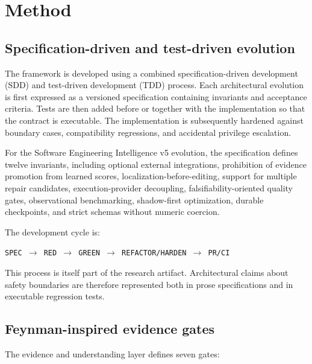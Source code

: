 \section{Method}

\subsection{Specification-driven and test-driven evolution}

The framework is developed using a combined specification-driven development (SDD) and test-driven development (TDD) process. Each architectural evolution is first expressed as a versioned specification containing invariants and acceptance criteria. Tests are then added before or together with the implementation so that the contract is executable. The implementation is subsequently hardened against boundary cases, compatibility regressions, and accidental privilege escalation.

For the Software Engineering Intelligence v5 evolution, the specification defines twelve invariants, including optional external integrations, prohibition of evidence promotion from learned scores, localization-before-editing, support for multiple repair candidates, execution-provider decoupling, falsifiability-oriented quality gates, observational benchmarking, shadow-first optimization, durable checkpoints, and strict schemas without numeric coercion.

The development cycle is:

\begin{center}
\texttt{SPEC $\rightarrow$ RED $\rightarrow$ GREEN $\rightarrow$ REFACTOR/HARDEN $\rightarrow$ PR/CI}
\end{center}

This process is itself part of the research artifact. Architectural claims about safety boundaries are therefore represented both in prose specifications and in executable regression tests.

\subsection{Feynman-inspired evidence gates}

The evidence and understanding layer defines seven gates:

